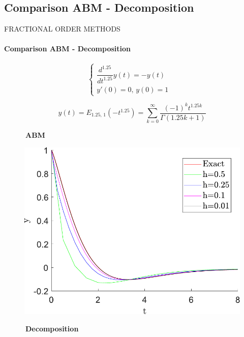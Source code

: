 \subsection{Comparison ABM - Decomposition}
\begin{frame}{FRACTIONAL ORDER METHODS}
\framesubtitle{Comparison ABM - Decomposition}
\begin{equation}
    \begin{cases}
        \dfrac{d^{1.25}}{dt^{1.25}}y(t)=-y(t)&\\
        y'(0)=0,\,y(0)=1
    \end{cases}
\end{equation}

\begin{equation}
    y(t) = E_{1.25,\,1}(-t^{1.25})=\sum_{k=0}^{\infty}\dfrac{(-1)^kt^{1.25k}}{\Gamma(1.25k +1)}
\end{equation}
\begin{multicols}{2}
$\qquad\quad$\textbf{ABM}\begin{figure}[H]
        \centering
        \includegraphics[scale=0.34]{files/ejemplo_adam.pdf}
    \end{figure}\columnbreak$\quad\qquad$\textbf{Decomposition}
    \vspace{-0.5cm}\begin{figure}[H]
        \centering

\end{figure}
\end{multicols}
\end{frame}
